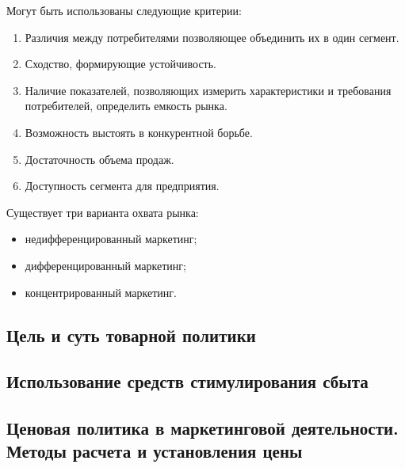 \documentclass[a4paper,12pt,oneside,final]{extarticle}
\numberwithin{equation}{section}
\begin{document}
Могут быть использованы следующие критерии:
\begin{enumerate}
	\item Различия между потребителями позволяющее объединить их в один сегмент.
	\item Сходство, формирующие устойчивость.
	\item Наличие показателей, позволяющих измерить характеристики и требования потребителей, определить емкость рынка.
	\item Возможность выстоять в конкурентной борьбе.
	\item Достаточность объема продаж.
	\item Доступность сегмента для предприятия.
\end{enumerate}

Существует три варианта охвата рынка:
\begin{itemize}
	\item недифференцированный маркетинг;
	\item дифференцированный маркетинг;
	\item концентрированный маркетинг.
\end{itemize}

\subsection{Цель и суть товарной политики}

\subsection{Использование средств стимулирования сбыта}

\subsection{Ценовая политика в маркетинговой деятельности. Методы расчета и установления цены}
\end{document}
